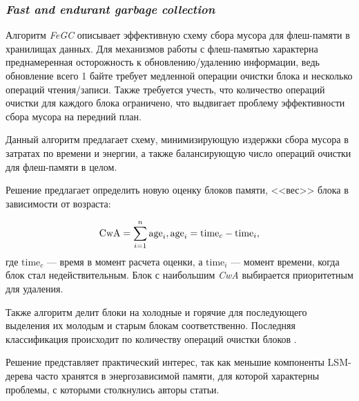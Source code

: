 \subsubsection{\textit{Fast and endurant garbage collection}}

Алгоритм \textit{FeGC} описывает эффективную схему сбора мусора для флеш-памяти
в хранилищах данных. Для механизмов работы с флеш-памятью характерна преднамеренная
осторожность к обновлению/удалению информации, ведь обновление всего 1 байте требует
медленной операции очистки блока и несколько операций чтения/записи. Также требуется
учесть, что количество операций очистки для каждого блока ограничено, что выдвигает
проблему эффективности сбора мусора на передний план.

Данный алгоритм предлагает схему, минимизирующую издержки сбора мусора в затратах
по времени и энергии, а также балансирующую число операций очистки для флеш-памяти
в целом.

Решение предлагает определить новую оценку блоков памяти, <<вес>> блока в зависимости
от возраста:

\begin{equation}
    \text{CwA} = \sum_{i=1}^n \text{age}_i,\\
    \text{age}_i = \text{time}_c - \text{time}_i,
\end{equation}
где $\text{time}_c$ — время в момент расчета оценки, а $\text{time}_i$ — момент
времени, когда блок стал недействительным. Блок с наибольшим \textit{CwA}
выбирается приоритетным для удаления.

Также алгоритм делит блоки на холодные и горячие для последующего выделения их
молодым и старым блокам соответственно. Последняя классификация происходит по
количеству операций очистки блоков \cite{FeGC:2011}\cite{FeGC:2014}.

Решение представляет практический интерес, так как меньшие компоненты LSM-дерева
часто хранятся в энергозависимой памяти, для которой характерны проблемы, с
которыми столкнулись авторы статьи.